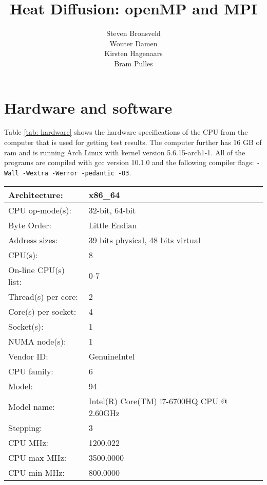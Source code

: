 \documentclass[a4paper]{article}
\author{Steven Bronsveld\\Wouter Damen\\Kirsten Hagenaars\\Bram Pulles}
\title{\textbf{Heat Diffusion: openMP and MPI}}
\begin{document}
\maketitle

\tableofcontents

\pagebreak
\section{Hardware and software}
Table \ref{tab: hardware} shows the hardware specifications of the CPU from the computer that is used for getting test results. The computer further has 16 GB of ram and is running Arch Linux with kernel version 5.6.15-arch1-1. All of the programs are compiled with gcc version 10.1.0 and the following compiler flags: \texttt{-Wall -Wextra -Werror -pedantic -O3}.
\begin{table}[h]
    \centering
    \begin{tabular}{|l|l|}
        \hline
        Architecture:        &    x86\_64\\\hline
        CPU op-mode(s):      &    32-bit, 64-bit\\\hline
        Byte Order:          &    Little Endian\\\hline
        Address sizes:       &    39 bits physical, 48 bits virtual\\\hline
        CPU(s):              &    8\\\hline
        On-line CPU(s) list: &    0-7\\ \hline
        Thread(s) per core:  &    2\\\hline
        Core(s) per socket:  &    4\\\hline
        Socket(s):           &    1\\\hline
        NUMA node(s):        &    1\\\hline
        Vendor ID:           &    GenuineIntel\\\hline
        CPU family:          &    6\\\hline
        Model:               &    94\\\hline
        Model name:          &    Intel(R) Core(TM) i7-6700HQ CPU @ 2.60GHz\\\hline
        Stepping:            &    3\\\hline
        CPU MHz:             &    1200.022\\\hline
        CPU max MHz:         &    3500.0000\\\hline
        CPU min MHz:         &    800.0000\\\hline

\end{tabular}
\end{table}
\end{document}
